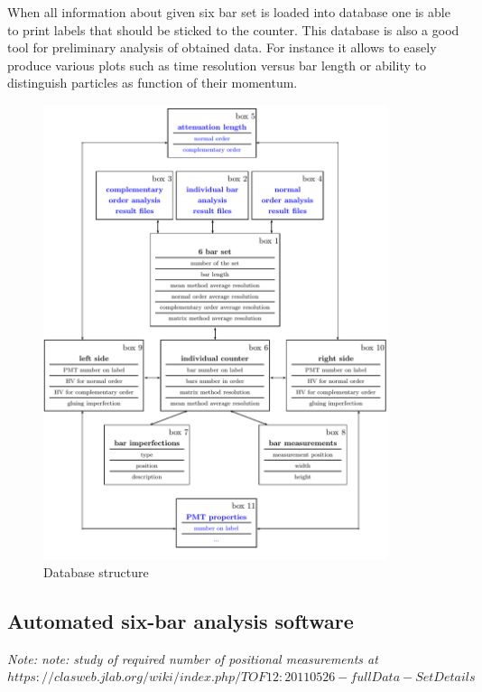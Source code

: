 When all information about given six bar set is loaded into database one is able to print labels that should be sticked to the counter. This database is also a good tool for preliminary analysis of obtained data. For instance it allows to easely produce various plots such as time resolution versus bar length or ability to distinguish particles as function of their momentum.



\begin{figure}[]
\begin{center}
\includegraphics[width=0.9\textwidth]{gleb/fig_gleb_quality_control/db_chart.pdf}
\caption{Database structure \label{fig:db}}
\end{center}
\end{figure}




\subsection{Automated six-bar analysis software}
\label{sect:soft}
{\it Note:
note: study of required number of positional measurements at $https://clasweb.jlab.org/wiki/index.php/TOF12:20110526-fullData-SetDetails$
}

